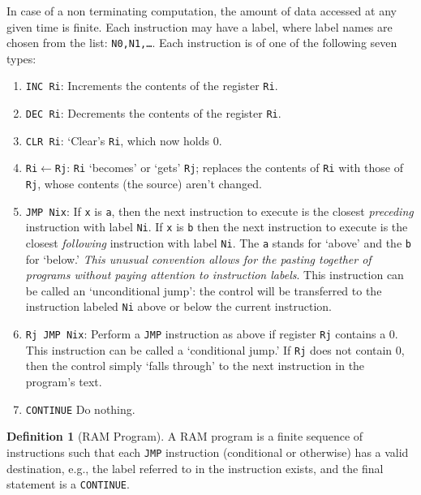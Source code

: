 \documentclass[11pt]{book}
\theoremstyle{definition}
\newtheorem{definition}{Definition}
\theoremstyle{plain}
\theoremstyle{problemstyle}
\theoremstyle{remark}
\theoremstyle{definition}
\begin{document}
\begin{mybox}[RAM]
    In case of a non terminating computation, the amount of data accessed at any given time is finite. Each instruction may have a label, where label
    names are chosen from the list: \texttt{N0,N1,\dots}. Each instruction is of one of the following seven types:
    \begin{enumerate}
        \item \texttt{INC Ri}: Increments the contents of the register \texttt{Ri}.
        \item \texttt{DEC Ri}: Decrements the contents of the register \texttt{Ri}.
        \item \texttt{CLR Ri}: `Clear's \texttt{Ri}, which now holds 0.
        \item \texttt{Ri$\leftarrow$Rj}: \texttt{Ri} `becomes' or `gets' \texttt{Rj}; replaces the contents of \texttt{Ri} with those of \texttt{Rj}, whose contents (the source) aren't changed.
        \item \texttt{JMP Nix}: If \texttt{x} is \texttt{a}, then the next instruction to execute is the closest \emph{preceding} instruction with label \texttt{Ni}. If \texttt{x} is \texttt{b} then the next instruction to execute is the closest \emph{following} instruction with label \texttt{Ni}. The \texttt{a} stands for `above' and the \texttt{b} for `below.' \emph{This unusual convention allows for the pasting together of programs without paying attention to instruction labels}. This instruction can be called an `unconditional jump': the control will be transferred to the instruction labeled \texttt{Ni} above or below the current instruction.
        \item \texttt{Rj JMP Nix}: Perform a \texttt{JMP} instruction as above if register \texttt{Rj} contains a 0. This instruction can be called a `conditional jump.' If \texttt{Rj} does not contain 0, then the control simply `falls through' to the next instruction in the program's text.
        \item \texttt{CONTINUE} Do nothing.
    \end{enumerate}
\end{mybox}

\begin{definition}[RAM Program]
    \label{def:ram-program}
    A RAM program is a finite sequence of instructions such that each \texttt{JMP} instruction (conditional or otherwise) has a valid destination, e.g., the label referred to in the instruction exists, and the final statement is a \texttt{CONTINUE}. 
\end{definition}
\end{document}
